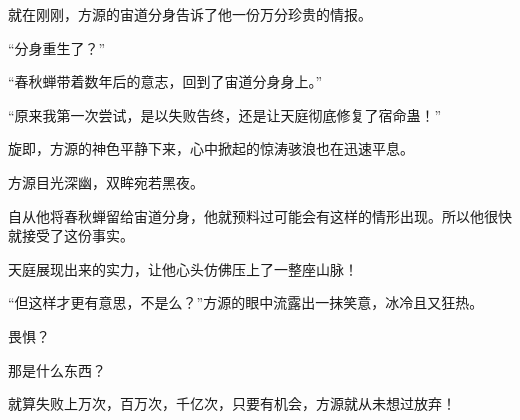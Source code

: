 \begin{this_body}
就在刚刚，方源的宙道分身告诉了他一份万分珍贵的情报。

“分身重生了？”

“春秋蝉带着数年后的意志，回到了宙道分身身上。”

“原来我第一次尝试，是以失败告终，还是让天庭彻底修复了宿命蛊！”

旋即，方源的神色平静下来，心中掀起的惊涛骇浪也在迅速平息。

方源目光深幽，双眸宛若黑夜。

自从他将春秋蝉留给宙道分身，他就预料过可能会有这样的情形出现。所以他很快就接受了这份事实。

天庭展现出来的实力，让他心头仿佛压上了一整座山脉！

“但这样才更有意思，不是么？”方源的眼中流露出一抹笑意，冰冷且又狂热。

畏惧？

那是什么东西？

就算失败上万次，百万次，千亿次，只要有机会，方源就从未想过放弃！

\end{this_body}

